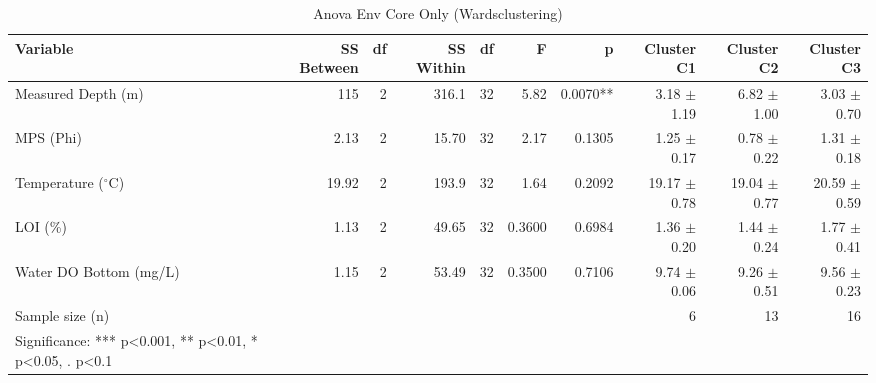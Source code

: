 \begin{table}[htbp]
  \centering
  \caption{Anova Env Core Only (Wardsclustering)}
  \label{tab:WardsClustering_tables_anova_env_core_only}
  \small
  \begin{tabular}{lrrrrrrrrr}
    \toprule
    Variable & SS Between & df & SS Within & df  & F & p & Cluster C1 & Cluster C2 & Cluster C3 \\
    \midrule
    Measured Depth (m) & 115 & 2 & 316.1 & 32 & 5.82 & 0.0070** & 3.18 $\pm$ 1.19 & 6.82 $\pm$ 1.00 & 3.03 $\pm$ 0.70 \\
    MPS (Phi) & 2.13 & 2 & 15.70 & 32 & 2.17 & 0.1305 & 1.25 $\pm$ 0.17 & 0.78 $\pm$ 0.22 & 1.31 $\pm$ 0.18 \\
    Temperature ($^{\circ}$C) & 19.92 & 2 & 193.9 & 32 & 1.64 & 0.2092 & 19.17 $\pm$ 0.78 & 19.04 $\pm$ 0.77 & 20.59 $\pm$ 0.59 \\
    LOI (\%) & 1.13 & 2 & 49.65 & 32 & 0.3600 & 0.6984 & 1.36 $\pm$ 0.20 & 1.44 $\pm$ 0.24 & 1.77 $\pm$ 0.41 \\
    Water DO Bottom (mg/L) & 1.15 & 2 & 53.49 & 32 & 0.3500 & 0.7106 & 9.74 $\pm$ 0.06 & 9.26 $\pm$ 0.51 & 9.56 $\pm$ 0.23 \\
    Sample size (n) &  &  &  &  &  &  & 6 & 13 & 16 \\
    Significance: *** p<0.001, ** p<0.01, * p<0.05, . p<0.1 &  &  &  &  &  &  &  &  &  \\
    \bottomrule
  \end{tabular}
\end{table}
